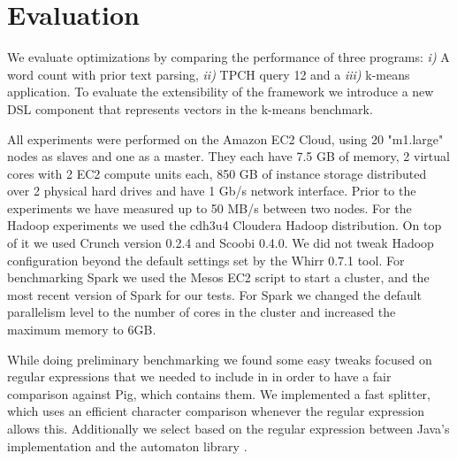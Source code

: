 \section{Evaluation}
\label{sec:evaluation}

We evaluate \tool optimizations by comparing the performance of three programs: \emph{i)} A word count with prior text parsing, \emph{ii)} TPCH \cite{tpch} query 12 and a  \emph{iii)} k-means application. To evaluate the extensibility of the framework we introduce a new DSL component that represents vectors in the k-means benchmark.

All experiments were performed on the Amazon EC2 Cloud, using 20 "m1.large" nodes as slaves and one as a master. They each have 7.5 GB of memory, 2 virtual cores with 2 EC2 compute units each, 850 GB of instance storage distributed over 2 physical hard drives and have 1 Gb/s network interface. Prior to the experiments we have measured up to 50 MB/s between two nodes. For the Hadoop experiments we used the cdh3u4 Cloudera Hadoop distribution. On top of it we used Crunch version 0.2.4 and Scoobi 0.4.0. We did not tweak Hadoop configuration beyond the default settings set by the Whirr 0.7.1  tool. For benchmarking Spark we used the Mesos \cite{hindman_mesos:_2011} EC2 script to start a cluster, and the most recent version of Spark for our tests. For Spark we changed the default parallelism level to the number of cores in the cluster and increased the maximum memory to 6GB. 

While doing preliminary benchmarking we found some easy tweaks focused on regular expressions that we needed to include in \tool in order to have a fair comparison against Pig, which contains them. We implemented a fast splitter, which uses an efficient character comparison whenever the regular expression allows this. Additionally we select based on the regular expression between Java's implementation and the automaton library \cite{mollerdk}.


